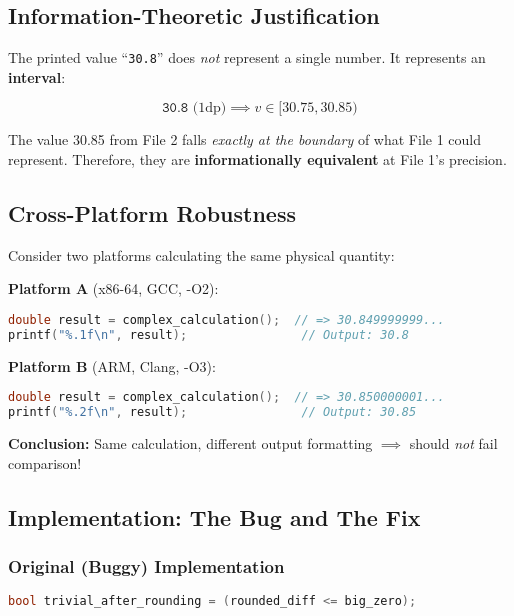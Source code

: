 \subsection{Information-Theoretic Justification}

The printed value ``\texttt{30.8}'' does \emph{not} represent a single number. It represents an \textbf{interval}:

\begin{equation}
    \texttt{30.8} \text{ (1dp)} \implies v \in [30.75, 30.85)
\end{equation}

The value 30.85 from File 2 falls \emph{exactly at the boundary} of what File 1 could represent. Therefore, they are \textbf{informationally equivalent} at File 1's precision.

\subsection{Cross-Platform Robustness}

Consider two platforms calculating the same physical quantity:

\textbf{Platform A} (x86-64, GCC, -O2):
\begin{lstlisting}[language=C]
double result = complex_calculation();  // => 30.849999999...
printf("%.1f\n", result);                // Output: 30.8
\end{lstlisting}

\textbf{Platform B} (ARM, Clang, -O3):
\begin{lstlisting}[language=C]
double result = complex_calculation();  // => 30.850000001...
printf("%.2f\n", result);                // Output: 30.85
\end{lstlisting}

\textbf{Conclusion:} Same calculation, different output formatting $\implies$ should \emph{not} fail comparison!

\subsection{Implementation: The Bug and The Fix}

\subsubsection{Original (Buggy) Implementation}

\begin{lstlisting}[language=C++]
bool trivial_after_rounding = (rounded_diff <= big_zero);
\end{lstlisting}

